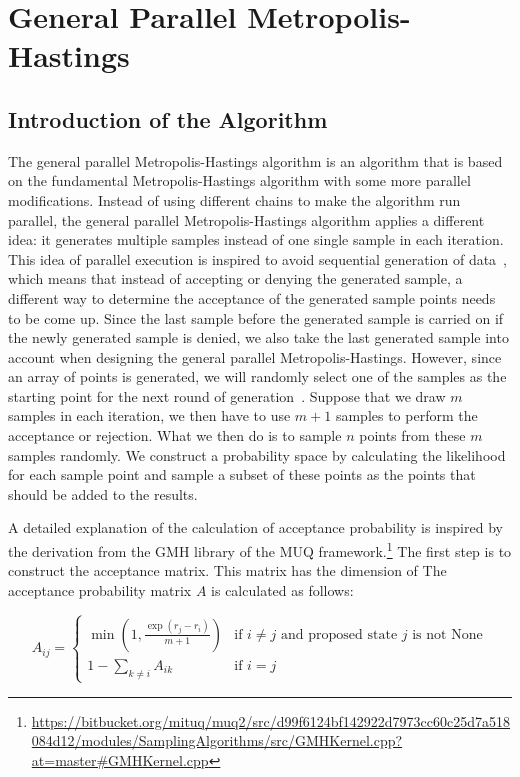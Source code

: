 \chapter{General Parallel Metropolis-Hastings}

\section{Introduction of the Algorithm}
The general parallel Metropolis-Hastings algorithm is an algorithm that is based on the fundamental Metropolis-Hastings algorithm with some more parallel modifications. Instead of using different chains to make the algorithm run parallel, the general parallel Metropolis-Hastings algorithm applies a different idea: it generates multiple samples instead of one single sample in each iteration. This idea of parallel execution is inspired to avoid sequential generation of data~\cite{gpmh_broshure}, which means that instead of accepting or denying the generated sample, a different way to determine the acceptance of the generated sample points needs to be come up. Since the last sample before the generated sample is carried on if the newly generated sample is denied, we also take the last generated sample into account when designing the general parallel Metropolis-Hastings. However, since an array of points is generated, we will randomly select one of the samples as the starting point for the next round of generation~\cite{gpmh_derivation}. Suppose that we draw $m$ samples in each iteration, we then have to use $m + 1$ samples to perform the acceptance or rejection. What we then do is to sample $n$ points from these $m$ samples randomly. We construct a probability space by calculating the likelihood for each sample point and sample a subset of these points as the points that should be added to the results.

A detailed explanation of the calculation of acceptance probability is inspired by the derivation from the GMH library of the MUQ framework.\footnote{\url{https://bitbucket.org/mituq/muq2/src/d99f6124bf142922d7973cc60c25d7a518084d12/modules/SamplingAlgorithms/src/GMHKernel.cpp?at=master#GMHKernel.cpp}} The first step is to construct the acceptance matrix. This matrix has the dimension of  The acceptance probability matrix \( A \) is calculated as follows:

\begin{equation}
A_{ij} = 
\begin{cases} 
\min\left(1, \frac{\exp(r_j - r_i)}{m + 1}\right) & \text{if } i \neq j \text{ and } \text{proposed state } j \text{ is not None} \\
1-\sum_{k \neq i} A_{ik} & \text{if } i = j
\end{cases}
\end{equation}

